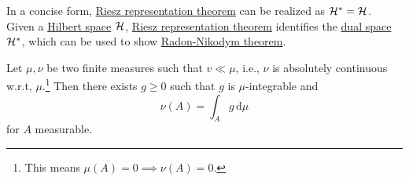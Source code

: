 In a concise form, \hyperref[thm:Riesz-representation]{Riesz representation theorem} can be realized as \(\mathcal{\MakeUppercase{h}} ^{\ast} = \mathcal{\MakeUppercase{h}} \). Given a \hyperref[def:Hilbert-space]{Hilbert space} \(\mathcal{\MakeUppercase{h}} \), \hyperref[thm:Riesz-representation]{Riesz representation theorem} identifies the \hyperref[def:dual-space]{dual space} \(\mathcal{\MakeUppercase{h}} ^{\ast} \), which can be used to show \hyperref[thm:Radon-Nikodym]{Radon-Nikodym theorem}.

\begin{theorem}\label{thm:Radon-Nikodym}
	Let \(\mu , \nu \) be two finite measures such that \(v \ll \mu \), i.e., \(\nu \) is absolutely continuous w.r.t, \(\mu \).\footnote{This means \(\mu (A) = 0 \implies \nu (A) = 0\).} Then there exists \(g \geq 0\) such that \(g\) is \(\mu \)-integrable and
	\[
		\nu (A) = \int _A g \,\mathrm{d} \mu
	\]
	for \(A\) measurable.
\end{theorem}
